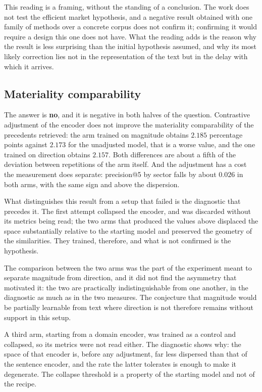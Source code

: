 This reading is a framing, without the standing of a conclusion. The work does not test the efficient market
hypothesis, and a negative result obtained with one family of methods over a concrete corpus does
not confirm it; confirming it would require a design this one does not have. What the reading adds
is the reason why the result is less surprising than the initial hypothesis assumed, and why its
most likely correction lies not in the representation of the text but in the delay with which it
arrives.

\subsection{Materiality comparability}
\label{sec:con_qi4}

The answer is \textbf{no}, and it is negative in both halves of the question. Contrastive
adjustment of the encoder does not improve the materiality comparability of the precedents
retrieved: the arm trained on magnitude obtains $2.185$ percentage points against $2.173$ for the
unadjusted model, that is a worse value, and the one trained on direction obtains $2.157$. Both
differences are about a fifth of the deviation between repetitions of the arm itself. And the
adjustment has a cost the measurement does separate: precision@5 by sector falls by about $0.026$
in both arms, with the same sign and above the dispersion.

What distinguishes this result from a setup that failed is the diagnostic that precedes it. The
first attempt collapsed the encoder, and was discarded without its metrics being read; the two
arms that produced the values above displaced the space substantially relative to the starting
model and preserved the geometry of the similarities. They trained, therefore, and what is not
confirmed is the hypothesis.

The comparison between the two arms was the part of the experiment meant to separate magnitude
from direction, and it did not find the asymmetry that motivated it: the two are practically
indistinguishable from one another, in the diagnostic as much as in the two measures. The
conjecture that magnitude would be partially learnable from text where direction is not therefore
remains without support in this setup.

A third arm, starting from a domain encoder, was trained as a control and collapsed, so its
metrics were not read either. The diagnostic shows why: the space of that encoder is, before
any adjustment, far less dispersed than that of the sentence encoder, and the rate the latter
tolerates is enough to make it degenerate. The collapse threshold is a property of the
starting model and not of the recipe.

